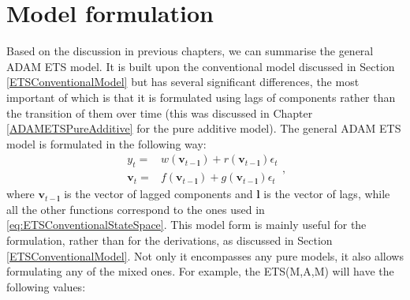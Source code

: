 \documentclass[]{book}
\theoremstyle{definition}
\theoremstyle{definition}
\theoremstyle{definition}
\theoremstyle{definition}
\theoremstyle{remark}
\begin{document}
\hypertarget{ADAMETSGeneral}{%
\section{Model formulation}\label{ADAMETSGeneral}}

Based on the discussion in previous chapters, we can summarise the general ADAM ETS model. It is built upon the conventional model discussed in Section \ref{ETSConventionalModel} but has several significant differences, the most important of which is that it is formulated using lags of components rather than the transition of them over time (this was discussed in Chapter \ref{ADAMETSPureAdditive} for the pure additive model). The general ADAM ETS model is formulated in the following way:
\begin{equation}
  \begin{aligned}
    {y}_{t} = &w(\mathbf{v}_{t-\mathbf{l}}) + r(\mathbf{v}_{t-\mathbf{l}}) \epsilon_t \\
    \mathbf{v}_{t} = &f(\mathbf{v}_{t-\mathbf{l}}) + g(\mathbf{v}_{t-\mathbf{l}}) \epsilon_t
  \end{aligned},
  \label{eq:ETSADAMStateSpace}
\end{equation}
where \(\mathbf{v}_{t-\mathbf{l}}\) is the vector of lagged components and \(\mathbf{l}\) is the vector of lags, while all the other functions correspond to the ones used in \eqref{eq:ETSConventionalStateSpace}. This model form is mainly useful for the formulation, rather than for the derivations, as discussed in Section \ref{ETSConventionalModel}. Not only it encompasses any pure models, it also allows formulating any of the mixed ones. For example, the ETS(M,A,M) will have the following values:
\end{document}
